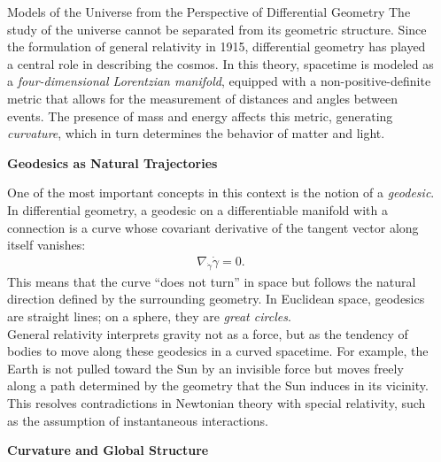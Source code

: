 \documentclass[final]{beamer}
\newlength{\sepwidth}
\newlength{\colwidth}
\newcommand{\separatorcolumn}{\begin{column}{\sepwidth}\end{column}}
\begin{document}
\begin{frame}[t]
\begin{columns}[t]
\separatorcolumn

\begin{column}{\colwidth}

  \begin{alertblock}{Models of the Universe from the Perspective of Differential Geometry}
    The study of the universe cannot be separated from its geometric structure. Since the formulation of general relativity in 1915, differential geometry has played a central role in describing the cosmos. In this theory, spacetime is modeled as a \textit{four-dimensional Lorentzian manifold}, equipped with a non-positive-definite metric that allows for the measurement of distances and angles between events. The presence of mass and energy affects this metric, generating \textit{curvature}, which in turn determines the behavior of matter and light.

    \textbf{\Large Geodesics as Natural Trajectories}

      One of the most important concepts in this context is the notion of a \textit{geodesic}. In differential geometry, a geodesic on a differentiable manifold with a connection is a curve whose covariant derivative of the tangent vector along itself vanishes:\\
      \begin{align*}
        \nabla_{\dot{\gamma}} \dot{\gamma} = 0.
      \end{align*}
      This means that the curve “does not turn” in space but follows the natural direction defined by the surrounding geometry. In Euclidean space, geodesics are straight lines; on a sphere, they are \textit{great circles}.\\
      General relativity interprets gravity not as a force, but as the tendency of bodies to move along these geodesics in a curved spacetime. For example, the Earth is not pulled toward the Sun by an invisible force but moves freely along a path determined by the geometry that the Sun induces in its vicinity. This resolves contradictions in Newtonian theory with special relativity, such as the assumption of instantaneous interactions.

    \textbf{\Large Curvature and Global Structure}


\end{alertblock}
\end{column}
\end{columns}
\end{frame}
\end{document}
